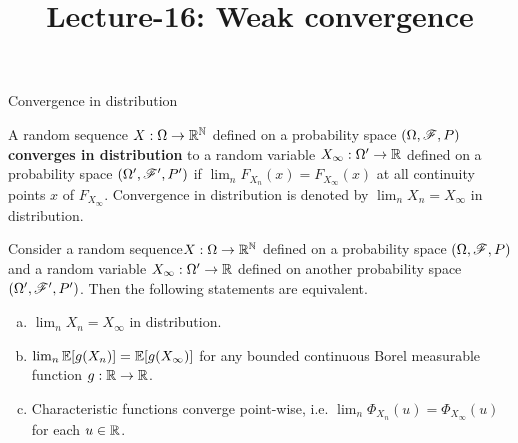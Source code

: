 \documentclass[12pt,aspectratio=169]{beamer}
\title{Lecture-16: Weak convergence}%
\date{}
\begin{document}
\pagestyle{empty}
\maketitle

\begin{frame}{Convergence in distribution}
\begin{Definition} 
A  random sequence $X:\Omega\to\mathbb{R}^{\mathbb{N}}$ defined on a probability space $(\Omega, \mathscr{F}, P)$ \textbf{converges in distribution} to a random variable $X_\infty:\Omega'\to\mathbb{R}$ defined on a probability space $(\Omega', \mathscr{F}', P')$  if $\lim_nF_{X_n}(x) = F_{X_\infty}(x)$ at all continuity points $x$ of $F_{X_\infty}$. 
Convergence in distribution is denoted by $\lim_nX_n = X_\infty$ in distribution. 
\end{Definition}
\end{frame}

\begin{frame}
\begin{prop}
\label{Prop:ConvDistEquivalence}
Consider a random sequence$X:\Omega\to\mathbb{R}^{\mathbb{N}}$ defined on a probability space $(\Omega, \mathscr{F}, P)$ and a random variable $X_\infty: \Omega'\to\mathbb{R}$ defined on another probability space $(\Omega', \mathscr{F}', P')$.  
Then the following statements are equivalent.
\begin{enumerate}[(a)]
\item<1-> $\lim_nX_n = X_\infty$ in distribution.
\item<2-> $\lim_n\mathbb{E}[g(X_n)] = \mathbb{E}[g(X_\infty)]$ for any bounded continuous Borel measurable function $g:\mathbb{R}\to\mathbb{R}$.
\item<3-> Characteristic functions converge point-wise, i.e. 
$\lim_n\Phi_{X_n}(u) = \Phi_{X_\infty}(u)$ for each $u \in \mathbb{R}$. 
\end{enumerate}
\end{prop}
\end{frame}
\end{document}
